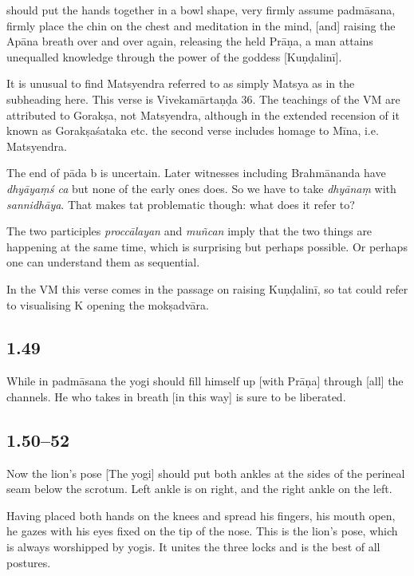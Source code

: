\begin{ekdosis}
\begin{translation} should put the hands together in a bowl shape, very firmly assume padmāsana, firmly place the chin on the chest and meditation in the mind, [and] raising the Apāna breath over and over again, releasing the held Prāṇa, a man attains unequalled knowledge through the power of the goddess [Kuṇḍalinī].
\end{translation}

\begin{philcomm}[hp01_048]
It is unusual to find Matsyendra referred to as simply Matsya as in the subheading here. This verse is Vivekamārtaṇḍa 36. The teachings of the VM are attributed to Gorakṣa, not Matsyendra, although in the extended recension of it known as Gorakṣaśataka etc. the second verse includes homage to Mīna, i.e. Matsyendra.

The end of pāda b is uncertain. Later witnesses including Brahmānanda have \emph{dhyāyaṃś ca} but none of the early ones does. So we have to take \emph{dhyānaṃ} with \emph{sannidhāya}. That makes tat problematic though: what does it refer to?

The two participles \emph{proccālayan} and \emph{muñcan} imply that the two things are happening at the same time, which is surprising but perhaps possible. Or perhaps one can understand them as sequential.

In the VM this verse comes in the passage on raising Kuṇḍalinī, so tat could refer to visualising K opening the mokṣadvāra.
\end{philcomm}

\subsection*{1.49}
\begin{translation}[hp01_049]
While in padmāsana the yogi should fill himself up [with Prāṇa] through [all] the channels.  He who takes in breath [in this way] is sure to be liberated.
\end{translation}

\subsection*{1.50--52}
\begin{translation}[hp01_050]
Now the lion’s pose
[The yogi] should put both ankles at the sides of the perineal seam below the scrotum. Left ankle is on right, and the right ankle on the left. 

Having placed both hands on the knees and spread his fingers, his mouth open, he gazes with his eyes fixed on the tip of the nose. This is the lion’s pose, which is always worshipped by yogis. It unites the three locks and is the best of all postures.
\end{translation}


\end{ekdosis}

